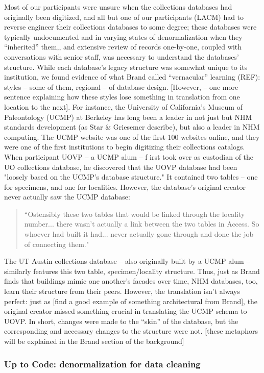 Most of our participants were unsure when the collections databases had originally been digitized, and all but one of our participants (LACM) had to reverse engineer their collections databases to some degree; these databases were typically undocumented and in varying states of denormalization when they “inherited” them,, and extensive review of records one-by-one, coupled with conversations with senior staff, was necessary to understand the databases’ structure.  While each database’s legacy structure was somewhat unique to its institution, we found evidence of what Brand called “vernacular” learning (REF): styles – some of them, regional – of database design. [However, -- one more sentence explaining how these styles lose something in translation from one location to the next].  For instance, the University of California’s Museum of Paleontology (UCMP) at Berkeley has long been a leader in not just but NHM standards development (as Star & Griesemer describe), but also a leader in NHM computing.  The UCMP website was one of the first 100 websites online, and they were one of the first institutions to begin digitizing their collections catalogs. When participant UOVP -- a UCMP alum -- f irst took over as custodian of the UO collections database, he discovered that the UOVP database had been "loosely based on the UCMP's database structure." It contained two tables -- one for specimens, and one for localities. However, the database’s original creator never actually saw the UCMP database:
\begin{quote}
“Ostensibly these two tables that would be linked through the locality number... there wasn't actually a link between the two tables in Access. So whoever had built it had... never actually gone through and done the job of connecting them."
\end{quote}
The UT Austin collections database – also originally built by a UCMP alum – similarly features this two table, specimen/locality structure. Thus, just as Brand finds that buildings mimic one another’s facades over time, NHM databases, too, learn their structure from their peers. However, the translation isn’t always perfect: just as [find a good example of something architectural from Brand], the original creator missed something crucial in translating the UCMP schema to UOVP.  In short, changes were made to the “skin” of the database, but the corresponding and necessary changes to the structure were not. [these metaphors will be explained in the Brand section of the background] 

\subsubsection{Up to Code: denormalization for data cleaning}

